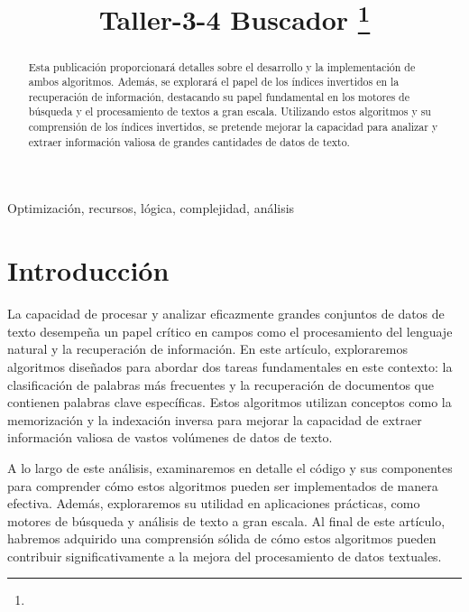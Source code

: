 \documentclass[conference]{IEEEtran}
\begin{document}
\title{Taller-3-4 Buscador
{\footnotesize \textsuperscript{}}
\thanks{}
}

\author{
}
\maketitle

\begin{abstract}
Esta publicación proporcionará detalles sobre el desarrollo y la implementación de ambos algoritmos. Además, se explorará el papel de los índices invertidos en la recuperación de información, destacando su papel fundamental en los motores de búsqueda y el procesamiento de textos a gran escala. Utilizando estos algoritmos y su comprensión de los índices invertidos, se pretende mejorar la capacidad para analizar y extraer información valiosa de grandes cantidades de datos de texto.
\end{abstract}
\begin{IEEEkeywords}
Optimización, recursos, lógica, complejidad, análisis
\end{IEEEkeywords}

\section{Introducción}
La capacidad de procesar y analizar eficazmente grandes conjuntos de datos de texto desempeña un papel crítico en campos como el procesamiento del lenguaje natural y la recuperación de información. En este artículo, exploraremos algoritmos diseñados para abordar dos tareas fundamentales en este contexto: la clasificación de palabras más frecuentes y la recuperación de documentos que contienen palabras clave específicas. Estos algoritmos utilizan conceptos como la memorización y la indexación inversa para mejorar la capacidad de extraer información valiosa de vastos volúmenes de datos de texto.

A lo largo de este análisis, examinaremos en detalle el código y sus componentes para comprender cómo estos algoritmos pueden ser implementados de manera efectiva. Además, exploraremos su utilidad en aplicaciones prácticas, como motores de búsqueda y análisis de texto a gran escala. Al final de este artículo, habremos adquirido una comprensión sólida de cómo estos algoritmos pueden contribuir significativamente a la mejora del procesamiento de datos textuales.
\end{document}
